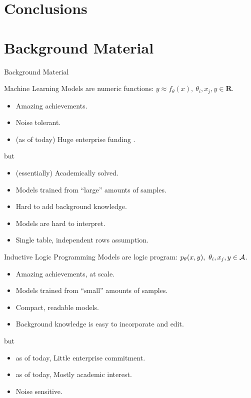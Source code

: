 \documentclass[bigger]{beamer}
\begin{document}
    \section{Conclusions}
    
    \begin{frame}
        \tableofcontents[currentsection]
    \end{frame}
    
    \section*{Background Material}
    
    \begin{frame}
        \Huge Background Material
    \end{frame}

    \begin{frame}{Machine Learning}
        Models are numeric functions: $y \approx f_\theta(x),~\theta_i, x_j, y\in\mathbf{R}$.
        \begin{itemize}
            \item Amazing achievements.
            \item Noise tolerant.
            \item (as of today) Huge enterprise funding .
        \end{itemize}
        but
        \begin{itemize}
            \item (essentially) Academically solved.
            \item Models trained from ``large'' amounts of samples.
            \item Hard to add background knowledge.
            \item Models are hard to interpret.
            \item Single table, independent rows assumption.
        \end{itemize}
    \end{frame}
    
    \begin{frame}{Inductive Logic Programming}
        Models are logic program: $p_\theta(x, y),~\theta_i, x_j, y\in{\cal A}$.
        \begin{itemize}
            \item Amazing achievements, at scale.
            \item Models trained from ``small'' amounts of samples.
            \item Compact, readable models.
            \item Background knowledge is easy to incorporate and edit.
        \end{itemize}
        but
        \begin{itemize}
            \item as of today, Little enterprise commitment.
            \item as of today, Mostly academic interest.
            \item Noise sensitive.
        \end{itemize}
    \end{frame}
\end{document}
